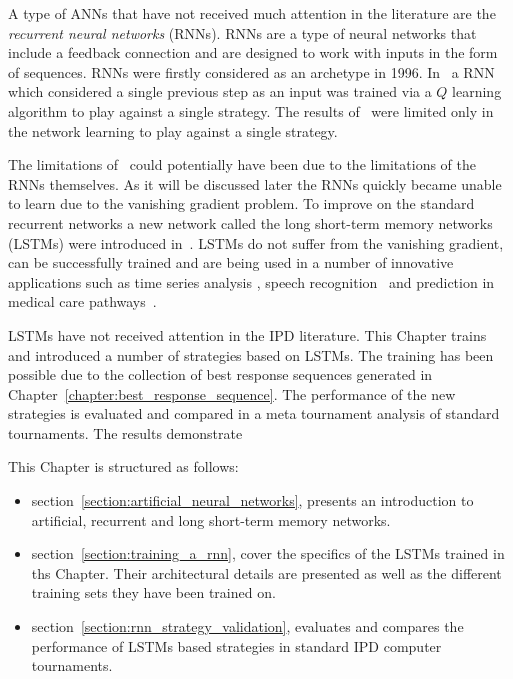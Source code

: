 A type of ANNs that have not received much attention in the literature are the
\textit{recurrent neural networks} (RNNs). RNNs are a type of neural networks
that include a feedback connection and are designed to work with inputs in
the form of sequences. RNNs were firstly considered as an archetype in 1996.
In~\cite{Sandholm1996} a RNN which considered a single previous step
as an input was trained via a \(Q\) learning algorithm to play against a single
strategy. The results of~\cite{Sandholm1996} were limited only in the network
learning to play against a single strategy.

The limitations of~\cite{Sandholm1996} could potentially have been due to the
limitations of the RNNs themselves. As it will be discussed later the RNNs
quickly became unable to learn due to the vanishing gradient problem.
To improve on the standard recurrent networks a new network called the
long short-term memory networks (LSTMs) were introduced in~\cite{Hochreiter1997}.
LSTMs do not suffer from the vanishing gradient, can be successfully trained and
are being used in a number of innovative applications such as time series analysis
\cite{Malhotra2015}, speech recognition~\cite{Sak2014} and prediction in
medical care pathways~\cite{Wang2018_lstm}.

LSTMs have not received attention in the IPD literature. This Chapter trains and
introduced a number of strategies  based on LSTMs. The training has been
possible due to the collection of best response sequences generated in
Chapter~\ref{chapter:best_response_sequence}. The performance of the new
strategies is evaluated and compared in a meta tournament analysis of standard
tournaments. The results demonstrate %

This Chapter is structured as follows:

\begin{itemize}
    \item section~\ref{section:artificial_neural_networks}, presents an
    introduction to artificial, recurrent and long short-term memory networks.
    \item section~\ref{section:training_a_rnn}, cover the specifics of the LSTMs
    trained in ths Chapter. Their architectural details are presented as well as
    the different training sets they have been trained on.
    \item section~\ref{section:rnn_strategy_validation}, evaluates and compares
    the performance of \lstmstrategies LSTMs based strategies in
    \metatournamentslstm standard IPD computer tournaments.
\end{itemize}

